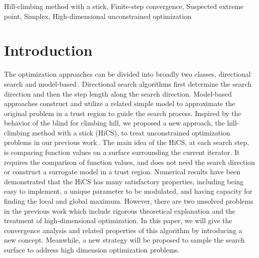 \documentclass[final,1p,times]{elsarticle}
\begin{document}
\begin{frontmatter}
\begin{keyword}
Hill-climbing method with a stick, Finite-step convergence,
Suspected extreme point, Simplex, 
High-dimensional unconstrained optimization
\end{keyword}

\end{frontmatter}


\section{Introduction}
\label{sec:intro}

The optimization approaches can be divided into broadly two
classes, directional search and
model-based\,\cite{sun2006optimization, nocedal2006numerical,
conn2009introduction}.
Directional search algorithms first determine the search
direction and then the step length along the search
direction. Model-based approaches construct and utilize a related simple
model to approximate the original problem in a trust region to
guide the search process. 
Inspired by the behavior of the blind for climbing hill, we
proposed a new approach, the hill-climbing method with a stick
(HiCS), to treat unconstrained optimization problems in
our previous work\,\cite{huang2017hill}.
The main idea of the HiCS, at each search step, is comparing
function values on a surface surrounding the current iterator.
It requires the comparison of function values, and
does not need the search direction or construct a surrogate
model in a trust region.
Numerical results have been demonstrated that the HiCS has many 
satisfactory properties, including being easy to implement,
a unique parameter to be modulated, and having capacity
for finding the local and global maximum. 
However, there are two unsolved problems in the
previous work which include rigorous theoretical explanation and
the treatment of high-dimensional optimization.
In this paper, we will give the convergence analysis and related
properties of this algorithm by introducing a new concept. 
Meanwhile, a new strategy will be proposed to sample the search
surface to address high dimension optimization problems.
\end{document}
